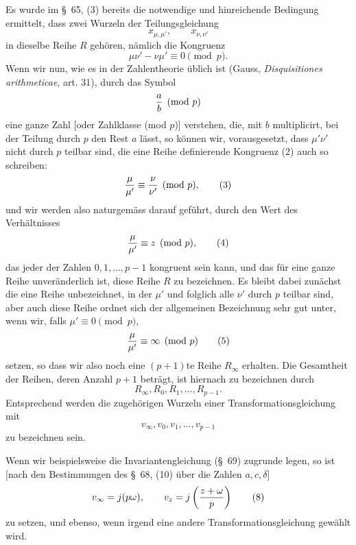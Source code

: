 \documentclass[11pt]{article}
\begin{document}
Es wurde im \S~65, (3) bereits die notwendige und hinreichende Bedingung ermittelt, dass zwei Wurzeln der Teilungsgleichung
\begin{equation}
 x_{\mu,\mu'},\qquad x_{\nu,\nu'}
\tag{1}
\end{equation}
in dieselbe Reihe $R$ gehören, nämlich die Kongruenz
\begin{equation}
 \mu\nu'-\nu\mu'\equiv0\pmod p.
\tag{2}
\end{equation}
Wenn wir nun, wie es in der Zahlentheorie üblich ist (Gauss, \emph{Disquisitiones arithmeticae}, art. 31), durch das Symbol
\[
 {a\over b}\pmod p
\]
eine ganze Zahl [oder Zahlklasse (mod $p$)] verstehen, die, mit $b$ multiplicirt, bei der Teilung durch $p$ den Rest $a$ lässt, so können wir, vorausgesetzt, dass $\mu'\nu'$ nicht durch $p$ teilbar sind, die eine Reihe definierende Kongruenz (2) auch so schreiben:
\begin{equation}
 {\mu\over \mu'}\equiv {\nu\over \nu'}\pmod p,
\tag{3}
\end{equation}
und wir werden also naturgemäss darauf geführt, durch den Wert des Verhältnisses
\begin{equation}
 {\mu\over \mu'}\equiv z\pmod p,
\tag{4}
\end{equation}
das jeder der Zahlen $0,1,\ldots,p-1$ kongruent sein kann, und das für eine ganze Reihe unveränderlich ist, diese Reihe $R$ zu bezeichnen. Es bleibt dabei zunächst die eine Reihe unbezeichnet, in der $\mu'$ und folglich alle $\nu'$ durch $p$ teilbar sind, aber auch diese Reihe ordnet sich der allgemeinen Bezeichnung sehr gut unter, wenn wir, falls $\mu'\equiv0\pmod p$,
\begin{equation}
 {\mu\over \mu'}\equiv\infty\pmod p
\tag{5}
\end{equation}
setzen, so dass wir also noch eine $(p+1)$te Reihe $R_\infty$ erhalten. Die Gesamtheit der Reihen, deren Anzahl $p+1$ beträgt, ist hiernach zu bezeichnen durch
\begin{equation}
 R_\infty,R_0,R_1,\ldots,R_{p-1}.
\tag{6}
\end{equation}
Entsprechend werden die zugehörigen Wurzeln einer Transformationsgleichung mit
\begin{equation}
 v_\infty,v_0,v_1,\ldots,v_{p-1}
\tag{7}
\end{equation}
zu bezeichnen sein.

Wenn wir beispielsweise die Invariantengleichung (\S~69) zugrunde legen, so ist [nach den Bestimmungen des \S~68, (10) über die Zahlen $a,c,\delta$]
\begin{equation}
 v_\infty=j(p\omega),
 \qquad
 v_z=j\left({z+\omega\over p}\right)
\tag{8}
\end{equation}
zu setzen, und ebenso, wenn irgend eine andere Transformationsgleichung gewählt wird.
\end{document}
